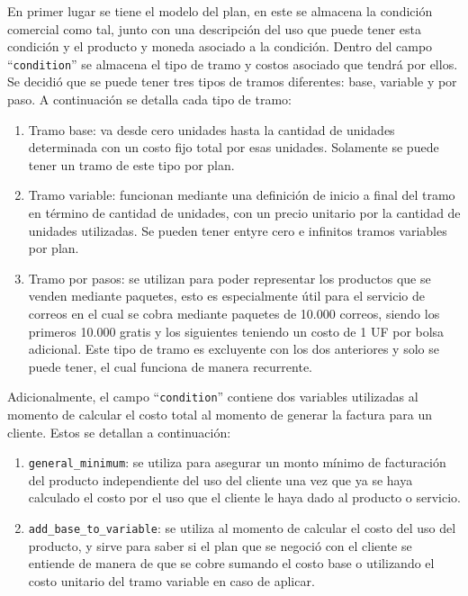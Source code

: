     En primer lugar se tiene el modelo del plan, en este se almacena la condición comercial como tal, junto con una descripción del uso que puede tener esta condición y el producto y moneda asociado a la condición. Dentro del campo ``\texttt{condition}'' se almacena el tipo de tramo y costos asociado que tendrá por ellos. Se decidió que se puede tener tres tipos de tramos diferentes: base, variable y por paso. A continuación se detalla cada tipo de tramo:
    \begin{enumerate}
      \item Tramo base: va desde cero unidades hasta la cantidad de unidades determinada con un costo fijo total por esas unidades. Solamente se puede tener un tramo de este tipo por plan.
      \item Tramo variable: funcionan mediante una definición de inicio a final del tramo en término de cantidad de unidades, con un precio unitario por la cantidad de unidades utilizadas. Se pueden tener entyre cero e infinitos tramos variables por plan.
      \item Tramo por pasos: se utilizan para poder representar los productos que se venden mediante paquetes, esto es especialmente útil para el servicio de correos en el cual se cobra mediante paquetes de 10.000 correos, siendo los primeros 10.000 gratis y los siguientes teniendo un costo de 1 UF por bolsa adicional. Este tipo de tramo es excluyente con los dos anteriores y solo se puede tener, el cual funciona de manera recurrente.
    \end{enumerate}
    
    Adicionalmente, el campo ``\texttt{condition}'' contiene dos variables utilizadas al momento de calcular el costo total al momento de generar la factura para un cliente. Estos se detallan a continuación:
    \begin{enumerate}
      \item \texttt{general\_minimum}: se utiliza para asegurar un monto mínimo de facturación del producto independiente del uso del cliente una vez que ya se haya calculado el costo por el uso que el cliente le haya dado al producto o servicio.
      \item \texttt{add\_base\_to\_variable}: se utiliza al momento de calcular el costo del uso del producto, y sirve para saber si el plan que se negoció con el cliente se entiende de manera de que se cobre sumando el costo base o utilizando el costo unitario del tramo variable en caso de aplicar.
    \end{enumerate}
    
